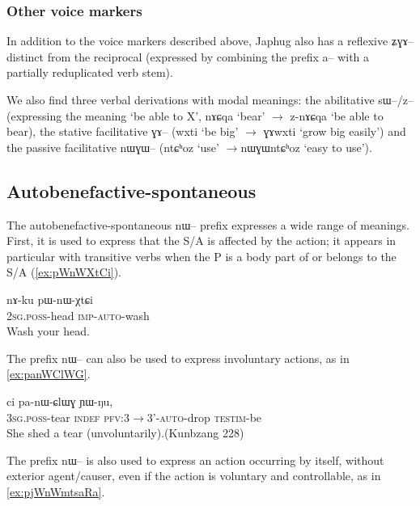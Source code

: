 \documentclass[oldfontcommands,oneside,a4paper,11pt]{article}
\newcommand{\ipa}[1]{{\phon #1}} %
\begin{document}
\subsubsection{Other voice markers}
In addition to the voice markers described above, Japhug also has a reflexive \ipa{ʑɣɤ--} distinct from the reciprocal (expressed by combining the prefix \ipa{a--} with a partially reduplicated verb stem).

We also find three verbal derivations with modal meanings: the abilitative \ipa{sɯ--/z--} (expressing the meaning `be able to X', \ipa{nɤɕqa} `bear' $\rightarrow$ \ipa{z-nɤɕqa} `be able to bear), the stative facilitative \ipa{ɣɤ--} (\ipa{wxti} `be big' $\rightarrow$ \ipa{ɣɤwxti} `grow big easily') and the passive facilitative \ipa{nɯɣɯ--} (\ipa{ntɕʰoz} `use' $\rightarrow$\ipa{nɯɣɯntɕʰoz} `easy to use').
   
\subsection{Autobenefactive-spontaneous}

The autobenefactive-spontaneous \ipa{nɯ--} prefix expresses a wide range of meanings. First, it is used to express that the S/A is affected by the action; it appears in particular with transitive verbs when the P is a body part of or belongs to the S/A (\ref{ex:pWnWXtCi}).

\begin{exe}
\ex \label{ex:pWnWXtCi}
\gll 
\ipa{nɤ-ku} 	\ipa{pɯ-nɯ-χtɕi} \\
\textsc{2sg.poss}-head \textsc{imp-auto}-wash \\
\glt Wash your head.
\end{exe}

The prefix \ipa{nɯ--} can also be used to express involuntary actions, as in \ref{ex:panWClWG}.

\begin{exe}
\ex \label{ex:panWClWG}
\gll \ipa{ɯ-qom} 	\ipa{ci} 	\ipa{pa-nɯ-ɕlɯɣ} 	\ipa{ɲɯ-ŋu,} \\
\textsc{3sg.poss}-tear \textsc{indef} \textsc{pfv:3$\rightarrow$3'-auto}-drop \textsc{testim}-be \\
\glt She shed a tear (unvoluntarily).(Kunbzang 228)
\end{exe}


The prefix \ipa{nɯ--} is also used to express an action occurring by itself, without exterior agent/causer, even if the action is voluntary and controllable, as in \ref{ex:pjWnWmtsaRa}.
\end{document}

